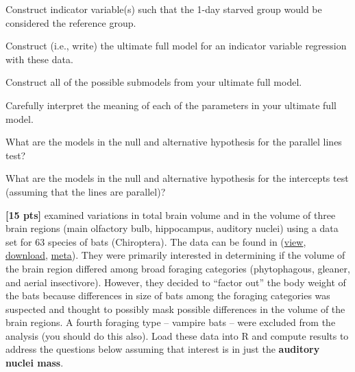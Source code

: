 \documentclass[10pt,openany]{book}\usepackage[]{graphicx}\usepackage[]{color}
\begin{document}
\begin{hwsection}
    \begin{Enumerate}
      \item Construct indicator variable(s) such that the 1-day starved group would be considered the reference group.
      \item Construct (i.e., write) the ultimate full model for an indicator variable regression with these data.
      \item Construct all of the possible submodels from your ultimate full model.
      \item Carefully interpret the meaning of each of the parameters in your ultimate full model.
      \item What are the models in the null and alternative hypothesis for the parallel lines test?
      \item What are the models in the null and alternative hypothesis for the intercepts test (assuming that the lines are parallel)?
    \end{Enumerate}


  \item \label{hwprob:LMIVRBatMorph} \textbf{[15 pts]} \cite{Hutcheonetal2002} examined variations in total brain volume and in the volume of three brain regions (main olfactory bulb, hippocampus, auditory nuclei) using a data set for 63 species of bats (Chiroptera).  The data can be found in  (\href{https://github.com/droglenc/NCData/blob/master/Batmorph2.csv}{view}, \href{https://raw.githubusercontent.com/droglenc/NCData/master/Batmorph2.csv}{download}, \href{https://github.com/droglenc/NCData/blob/master/Batmorph2_meta.txt}{meta}).  They were primarily interested in determining if the volume of the brain region differed among broad foraging categories (phytophagous, gleaner, and aerial insectivore).  However, they decided to ``factor out'' the body weight of the bats because differences in size of bats among the foraging categories was suspected and thought to possibly mask possible differences in the volume of the brain regions.  A fourth foraging type -- vampire bats -- were excluded from the analysis (you should do this also).  Load these data into R and compute results to address the questions below assuming that interest is in just the \textbf{auditory nuclei mass}.


\end{hwsection}
\end{document}
